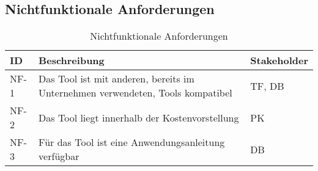 \subsection{Nichtfunktionale Anforderungen}
\label{subsec:nichtfunktional}

\begin{table}[H]
    {
        \begin{tabularx}{\linewidth}{|C{1cm}|X|C{2cm}|}
            \hline
            ID
             & Beschreibung
             & Stakeholder
            \\
            \hline
            NF-1
             & Das Tool ist mit anderen, bereits im Unternehmen verwendeten, Tools kompatibel
             & TF, DB
            \\
            NF-2
             & Das Tool liegt innerhalb der Kostenvorstellung
             & PK
            \\
            NF-3
             & Für das Tool ist eine Anwendungsanleitung verfügbar
             & DB
            \\
            \hline
        \end{tabularx}
    }
    \caption{Nichtfunktionale Anforderungen}
    \label{tab:nichtfunktional}
\end{table}